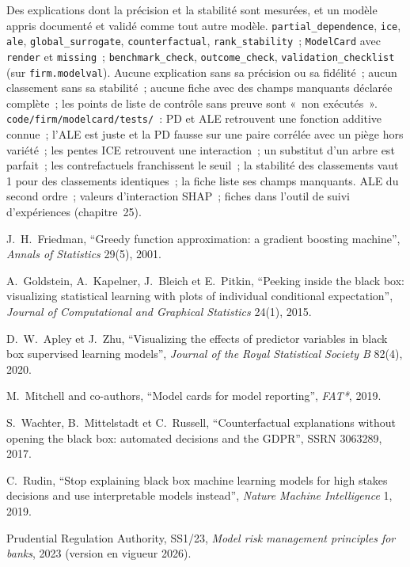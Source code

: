 \begin{build}
 Des explications dont la précision et la stabilité sont mesurées, et un modèle appris documenté et validé comme
tout autre modèle.
 \texttt{partial\_dependence}, \texttt{ice}, \texttt{ale}, \texttt{global\_surrogate},
\texttt{counterfactual}, \texttt{rank\_stability}~; \texttt{ModelCard} avec \texttt{render} et \texttt{missing}~;
\texttt{benchmark\_check}, \texttt{outcome\_check}, \texttt{validation\_checklist} (sur \texttt{firm.modelval}).
 Aucune explication sans sa précision ou sa fidélité~; aucun classement sans sa stabilité~; aucune fiche avec des champs manquants
déclarée complète~; les points de liste de contrôle sans preuve sont «~non exécutés~».
 \texttt{code/firm/modelcard/tests/}~: PD et ALE retrouvent une fonction additive connue~; l'ALE est juste et
la PD fausse sur une paire corrélée avec un piège hors variété~; les pentes ICE retrouvent une interaction~; un substitut d'un arbre est parfait~;
les contrefactuels franchissent le seuil~; la stabilité des classements vaut 1 pour des classements identiques~; la fiche liste ses champs manquants.
 ALE du second ordre~; valeurs d'interaction SHAP~; fiches dans l'outil de suivi d'expériences (chapitre~25).
\end{build}

\begin{omsources}
\item J.~H.~Friedman, ``Greedy function approximation: a gradient boosting machine'', \emph{Annals of Statistics} 29(5), 2001.
\item A.~Goldstein, A.~Kapelner, J.~Bleich et E.~Pitkin, ``Peeking inside the black box: visualizing statistical learning with
plots of individual conditional expectation'', \emph{Journal of Computational and Graphical Statistics} 24(1), 2015.
\item D.~W.~Apley et J.~Zhu, ``Visualizing the effects of predictor variables in black box supervised learning models'',
\emph{Journal of the Royal Statistical Society B} 82(4), 2020.
\item M.~Mitchell and co-authors, ``Model cards for model reporting'', \emph{FAT*}, 2019.
\item S.~Wachter, B.~Mittelstadt et C.~Russell, ``Counterfactual explanations without opening the black box: automated
decisions and the GDPR'', SSRN 3063289, 2017.
\item C.~Rudin, ``Stop explaining black box machine learning models for high stakes decisions and use interpretable models
instead'', \emph{Nature Machine Intelligence} 1, 2019.
\item Prudential Regulation Authority, SS1/23, \emph{Model risk management principles for banks}, 2023 (version en vigueur
2026).
\end{omsources}

